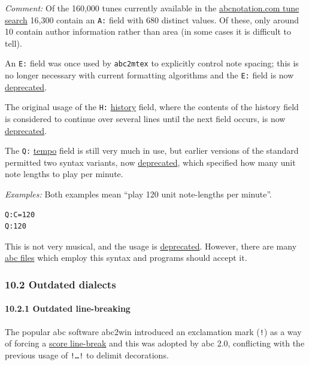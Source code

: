 \documentclass[oneside]{book}
\let\oldparagraph\paragraph
\renewcommand{\paragraph}[1]{\oldparagraph{#1}\mbox{}}
\begin{document}
\emph{Comment:} Of the 160,000 tunes currently available in the
\href{http://abcnotation.com/search}{abcnotation.com tune search} 16,300
contain an \texttt{A:} field with 680 distinct values. Of these, only
around 10 contain author information rather than area (in some cases it
is difficult to tell).

An \texttt{E:} field was once used by \texttt{abc2mtex} to explicitly
control note spacing; this is no longer necessary with current
formatting algorithms and the \texttt{E:} field is now
\protect\hyperlink{outdated_syntax}{deprecated}.

The original usage of the \texttt{H:}
\protect\hyperlink{hhistory}{history} field, where the contents of the
history field is considered to continue over several lines until the
next field occurs, is now
\protect\hyperlink{outdated_syntax}{deprecated}.

The \texttt{Q:} \protect\hyperlink{qtempo}{tempo} field is still very
much in use, but earlier versions of the standard permitted two syntax
variants, now \protect\hyperlink{outdated_syntax}{deprecated}, which
specified how many unit note lengths to play per minute.

\emph{Examples:} Both examples mean ``play 120 unit note-lengths per
minute''.

\begin{verbatim}
Q:C=120
Q:120
\end{verbatim}

This is not very musical, and the usage is
\protect\hyperlink{outdated_syntax}{deprecated}. However, there are many
\protect\hyperlink{abc_file_definition}{abc files} which employ this
syntax and programs should accept it.

\hypertarget{outdated_dialects}{\subsubsection{10.2 Outdated
dialects}\label{outdated_dialects}}

\hypertarget{outdated_line-breaking}{\paragraph{10.2.1 Outdated
line-breaking}\label{outdated_line-breaking}}

The popular abc software abc2win introduced an exclamation mark
(\texttt{!}) as a way of forcing a
\protect\hyperlink{score_line-break_definition}{score line-break} and
this was adopted by abc 2.0, conflicting with the previous usage of
\texttt{!\ldots{}!} to delimit decorations.
\end{document}
